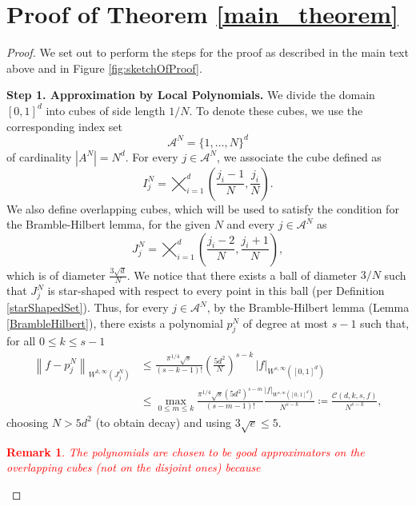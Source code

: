 \documentclass{article}
\newcommand{\fr}{\frac}
\newcommand{\be}{\begin{equation}}
\newcommand{\ee}{\end{equation}}
\newtheorem{rem}{Remark}
\newcommand{\WnormD}[4]{\left\lVert #1 \right\rVert_{W^{#2, #3} ({#4})}}
\newcommand{\todo}[1]{\textcolor{red}{#1}}
\numberwithin{Def}{section}
\newcommand{\N}{\mathbb N}
\begin{document}
\section{Proof of Theorem \ref{main_theorem}}
\begin{proof}
We set out to perform the steps for the proof as described in the main text above and in Figure \ref{fig:sketchOfProof}.

{\bf{Step 1. Approximation by Local Polynomials.}}
We divide the domain $[0,1]^d$ into cubes of side length $1/N$. To denote these cubes, we use the corresponding index set
\begin{equation}
    \mathcal{A}^N = \{1, \dots, N\}^d %
\end{equation}
of cardinality $|A^N| = N^d$. For every $j \in \mathcal{A}^N$, we associate the cube defined as 
\begin{equation}
    I_j^N = \bigtimes_{i=1}^d \left(\fr{j_i - 1}{N}, \fr{j_i}{N} \right).
\end{equation}
We also define overlapping cubes, which will be used to satisfy the condition for the Bramble-Hilbert lemma, for the given $N$ and every $j \in \mathcal{A}^N$ as
\begin{equation}
    J_j^N = \bigtimes_{i=1}^d \left(\fr{j_i - 2}{N}, \fr{j_i + 1}{N} \right),
\end{equation}
which is of diameter $\fr{3 \sqrt{d}}{N}$. We notice that there exists a ball of diameter $3/N$ such that $J_j^N$ is star-shaped with respect to every point in this ball (per Definition \ref{starShapedSet}). Thus, for every $j \in \mathcal{A}^N$, by the Bramble-Hilbert lemma (Lemma \ref{BrambleHilbert}), there exists a polynomial $p_j^N$ of degree at most $s-1$ such that, for all $0 \leq k \leq s-1$
\be\begin{aligned}
    \WnormD{f - p_j^N}{k}{\infty}{J_j^N} &\leq \fr{\pi^{1/4} \sqrt{s}}{(s-k-1)!} \left(\fr{5 d^2}{N} \right)^{s-k} \, |f|_{W^{s,\infty} ([0,1]^d)} \\
    &\leq \max_{0 \leq m \leq k} \fr{\pi^{1/4} \sqrt{s} (5d^2)^{s-m}}{(s-m-1)!} \fr{|f|_{W^{s, \infty} ([0,1]^d)}}{N^{s-k}} \coloneqq \fr{\mathcal{C} (d, k, s, f)}{N^{s-k}},
\end{aligned}\ee
choosing $N > 5d^2$ (to obtain decay) and using $3 \sqrt{e} \leq 5$.

\todo{\begin{rem}
    The polynomials are chosen to be good approximators on the overlapping cubes (not on the disjoint ones) because 
\end{rem}}


\end{proof}
\end{document}
